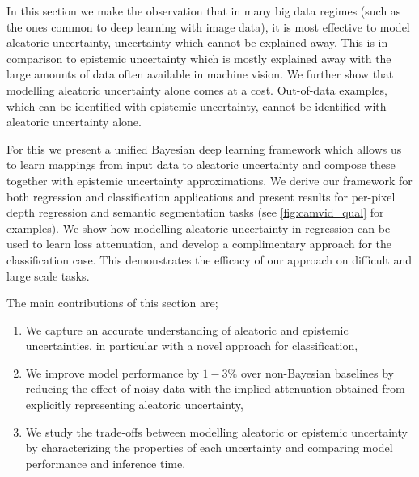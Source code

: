 In this section we make the observation that in many big data regimes (such as the ones common to deep learning with image data), it is most effective to model aleatoric uncertainty, uncertainty which cannot be explained away.
This is in comparison to epistemic uncertainty which is mostly explained away with the large amounts of data often available in machine vision.
We further show that modelling aleatoric uncertainty alone comes at a cost. Out-of-data examples, which can be identified with epistemic uncertainty, cannot be identified with aleatoric uncertainty alone.

For this we present a unified Bayesian deep learning framework which allows us to learn mappings from input data to aleatoric uncertainty and compose these together with epistemic uncertainty approximations. We derive our framework for both regression and classification applications and present results for per-pixel depth regression and semantic segmentation tasks (see \cref{fig:camvid_qual} for examples). 
We show how modelling aleatoric uncertainty in regression can be used to learn loss attenuation, and develop a complimentary approach for the classification case. 
This demonstrates the efficacy of our approach on difficult and large scale tasks.

The main contributions of this section are; 
\begin{enumerate}
\item We capture an accurate understanding of aleatoric and epistemic uncertainties, in particular with a novel approach for classification,
\item We improve model performance by $1-3\%$ over non-Bayesian baselines by reducing the effect of noisy data with the implied attenuation obtained from explicitly representing aleatoric uncertainty,
\item We study the trade-offs between modelling aleatoric or epistemic uncertainty by characterizing the properties of each uncertainty and comparing model performance and inference time.
\end{enumerate}

